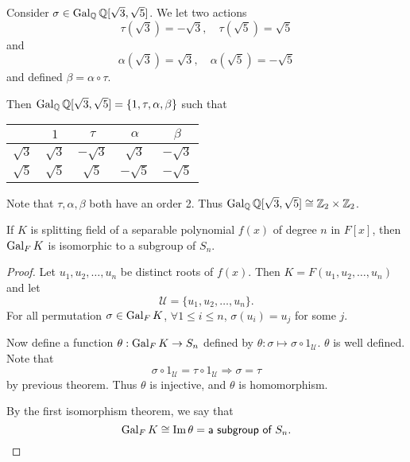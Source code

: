 \begin{example}
    Consider $\sigma \in \operatorname{Gal}_\mathbb{Q} \mathbb{Q}[\sqrt{3}, \sqrt{5}]$. We let two actions
    \[
        \tau(\sqrt{3}) = -\sqrt{3}, \quad \tau(\sqrt{5}) = \sqrt{5}
    \]
    and
    \[
        \alpha(\sqrt{3}) = \sqrt{3}, \quad \alpha(\sqrt{5}) = -\sqrt{5}
    \]
    and defined $\beta = \alpha \circ \tau$.

    Then $\operatorname{Gal}_\mathbb{Q} \mathbb{Q}[\sqrt{3}, \sqrt{5}] = \{ 1, \tau, \alpha, \beta \}$
    such that

    \begin{center}
        \begin{tabular}{|c|c|c|c|c|}
            \hline
            & $1$ & $\tau$ & $\alpha$ & $\beta$\\
            \hline
            $\sqrt{3}$ & $\sqrt{3}$ & $-\sqrt{3}$ & $\sqrt{3}$ & $-\sqrt{3}$\\[0.225em]
            \hline
            $\sqrt{5}$ & $\sqrt{5}$ & $\sqrt{5}$ & $-\sqrt{5}$ & $-\sqrt{5}$\\
            \hline
        \end{tabular}
    \end{center}

    Note that $\tau, \alpha, \beta$ both have an order 2. Thus $\operatorname{Gal}_\mathbb{Q} \mathbb{Q}[\sqrt{3}, \sqrt{5}] \cong 
    \mathbb{Z}_2 \times \mathbb{Z}_2$.
\end{example}

\begin{corollary}
    If $K$ is splitting field of a separable polynomial $f(x)$ of degree $n$ in $F[x]$, then $\operatorname{Gal}_F K$ is isomorphic 
    to a subgroup of $S_n$.
\end{corollary}
\begin{proof}
    Let $u_1, u_2, \ldots, u_n$ be distinct roots of $f(x)$. Then $K = F(u_1, u_2, \ldots, u_n)$ and let 
    \[\mathcal{U} = \{ u_1, u_2, \ldots, u_n \}.\] For all permutation $\sigma \in \operatorname{Gal}_F K$, $\forall 1 \leq i \leq n$, 
    $\sigma(u_i) = u_j$ for some $j$.

    Now define a function $\theta : \operatorname{Gal}_F K \to S_n$ defined by $\theta: \sigma \mapsto \sigma \circ 1_\mathcal{U}$. $\theta$ 
    is well defined. Note that 
    \[
        \sigma \circ 1_\mathcal{U} = \tau \circ 1_\mathcal{U} \Longrightarrow \sigma = \tau
    \]
    by previous theorem. Thus $\theta$ is injective, and $\theta$ is homomorphism.

    By the first isomorphism theorem, we say that 
    \[
      \operatorname{Gal}_F K \cong \operatorname{Im} \theta = \textsf{a subgroup of } S_n.
    \]
\end{proof}

